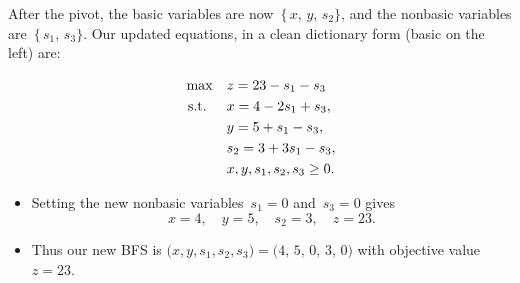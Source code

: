 \begin{tcolorbox}[colback=algopt!6, colframe=algopt, coltitle=white, fonttitle=\bfseries, sharp corners, title={\ding{52}\ Optimal: Final Dictionary}]

After the pivot, the basic variables are now
\(\,\{\,x,\,y,\,s_2\}\), 
and the nonbasic variables are 
\(\,\{\,s_1,\,s_3\}\).  
Our updated equations, in a clean dictionary form (basic on the left) are:

\[
\begin{aligned}
\max\quad 
& z = 23 - s_1 - s_3 \\
\mbox{ s.t. }\quad 
& x = 4 - 2s_1 + s_3, \\
& y = 5 + s_1 - s_3, \\
& s_2 = 3 + 3s_1 - s_3, \\
& x, y, s_1, s_2, s_3 \geq 0.
\end{aligned}
\]

\begin{itemize}
  \item Setting the new nonbasic variables \(\,s_1=0\) and \(\,s_3=0\) gives
  \[
  x=4, \quad y=5,\quad s_2=3,\quad z=23.
  \]
  \item Thus our new BFS is 
  \(\bigl(x,y,s_1,s_2,s_3\bigr)=\bigl(4,\,5,\,0,\,3,\,0\bigr)\) 
  with objective value \(z=23\).
\end{itemize}
\end{tcolorbox}

